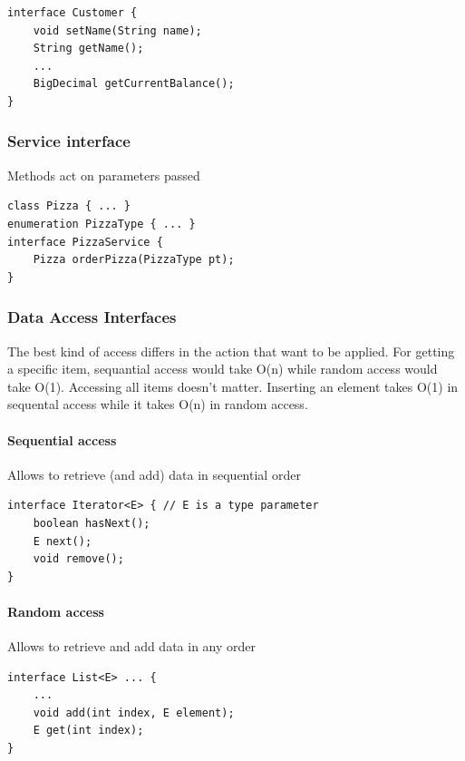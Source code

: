 \begin{lstlisting}
interface Customer {
    void setName(String name);
    String getName();
    ...
    BigDecimal getCurrentBalance();
}
\end{lstlisting}

\hypertarget{service-interface}{%
\subsubsection{Service interface}\label{service-interface}}

Methods act on parameters passed

\begin{lstlisting}
class Pizza { ... }
enumeration PizzaType { ... }
interface PizzaService {
    Pizza orderPizza(PizzaType pt);
}
\end{lstlisting}

\hypertarget{data-access-interfaces}{%
\subsubsection{Data Access Interfaces}\label{data-access-interfaces}}

The best kind of access differs in the action that want to be applied.
For getting a specific item, sequantial access would take O(n) while
random access would take O(1). Accessing all items doesn't matter.
Inserting an element takes O(1) in sequental access while it takes O(n)
in random access.

\hypertarget{sequential-access}{%
\paragraph{Sequential access}\label{sequential-access}}

Allows to retrieve (and add) data in sequential order

\begin{lstlisting}
interface Iterator<E> { // E is a type parameter
    boolean hasNext();
    E next();
    void remove();
}
\end{lstlisting}

\hypertarget{random-access}{%
\paragraph{Random access}\label{random-access}}

Allows to retrieve and add data in any order

\begin{lstlisting}
interface List<E> ... {
    ...
    void add(int index, E element);
    E get(int index);
}
\end{lstlisting}


